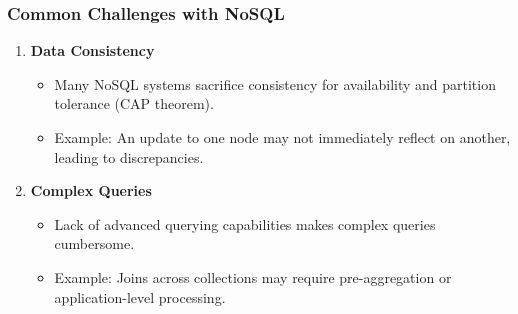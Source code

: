 \documentclass[aspectratio=169]{beamer}
\begin{document}
\begin{frame}[fragile]
    \frametitle{Common Challenges with NoSQL}
    
    \begin{enumerate}
        \item \textbf{Data Consistency}
            \begin{itemize}
                \item Many NoSQL systems sacrifice consistency for availability and partition tolerance (CAP theorem).
                \item Example: An update to one node may not immediately reflect on another, leading to discrepancies.
            \end{itemize}
        
        \item \textbf{Complex Queries}
            \begin{itemize}
                \item Lack of advanced querying capabilities makes complex queries cumbersome.
                \item Example: Joins across collections may require pre-aggregation or application-level processing.
            \end{itemize}
    \end{enumerate}
\end{frame}
\end{document}
